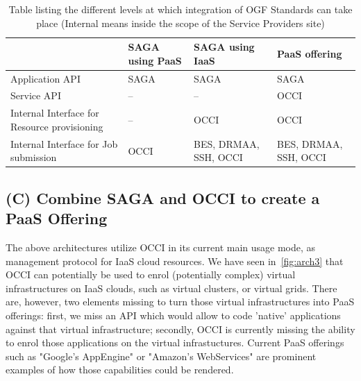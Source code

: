 \documentclass[10pt,conference,final,letterpaper,twoside,twocolumn,]{IEEEtran}
\newcommand{\B}[1]{\textbf{#1}}
\begin{document}
\begin{table}
\centering
\begin{tabular}{|p{20mm}|p{15mm}|p{15mm}|p{15mm}|}
\hline
                                             & \B{SAGA using PaaS}  & \B{SAGA using IaaS}           & \B{PaaS offering}     \\\hline
Application API                              & SAGA                 & SAGA                          & SAGA                  \\\hline
Service API                                  & --                   & --                            & OCCI                  \\\hline
Internal Interface for Resource provisioning & --                   & OCCI                          & OCCI                  \\\hline
Internal Interface for Job submission        & OCCI                 & BES, DRMAA, SSH, OCCI         & BES, DRMAA, SSH, OCCI \\\hline

\end{tabular}
\caption{Table listing the different levels at which integration of
  OGF Standards can take place (Internal means inside the scope of the
  Service Providers site)}
\label{table:standard-function}
\end{table}

\subsection{(C) Combine SAGA and OCCI to create a PaaS Offering}

The above architectures utilize OCCI in its current main usage mode,
as management protocol for IaaS cloud resources.  We have seen
in~\ref{fig:arch3} that OCCI can potentially be used to enrol
(potentially complex) virtual infrastructures on IaaS clouds, such as
virtual clusters, or virtual grids.  There are, however, two elements
missing to turn those virtual infrastructures into PaaS offerings:
first, we miss an API which would allow to code 'native' applications
against that virtual infrastructure; secondly, OCCI is currently
missing the ability to enrol those applications on the virtual
infrastuctures.  Current PaaS offerings such as "Google's AppEngine"
or "Amazon's WebServices" are prominent examples of how those
capabilities could be rendered.
\end{document}
